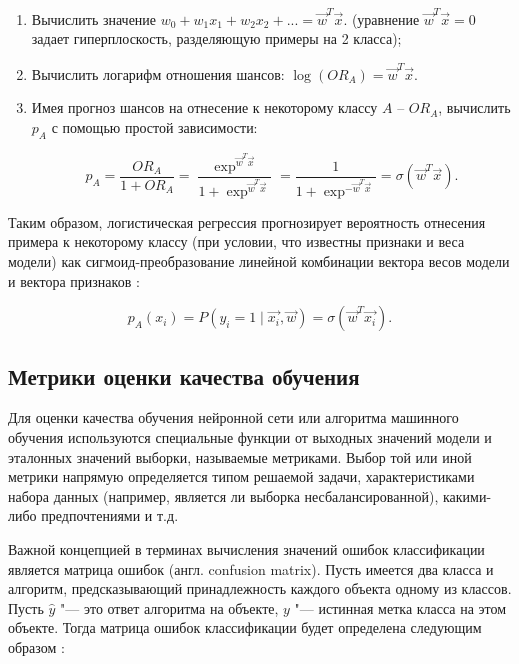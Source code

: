 \documentclass[bachelor, och, coursework]{SCWorks}
\begin{document}
            \begin{enumerate}
                \item Вычислить значение $w_{0}+w_{1}x_1 + w_{2}x_2 + ... =
                \vec{w}^T\vec{x}$. (уравнение $\vec{w}^T\vec{x} = 0$ задает
                гиперплоскость, разделяющую примеры на 2 класса);
                \item Вычислить логарифм отношения шансов: $ \log(OR_{A}) =
                \vec{w}^T\vec{x}$.
                \item Имея прогноз шансов на отнесение к некоторому классу $A$ –
                $OR_{A}$, вычислить $p_{A}$ с помощью простой зависимости:

                \begin{equation}    
                    p_{A} = \frac{OR_{A}}{1 + OR_{A}} =
                    \frac{\exp^{\vec{w}^T\vec{x}}}{1 + \exp^{\vec{w}^T\vec{x}}} =
                    \frac{1}{1 + \exp^{-\vec{w}^T\vec{x}}} = \sigma(\vec{w}^T\vec{x}).
                \end{equation}

            \end{enumerate}

            Таким образом, логистическая регрессия прогнозирует вероятность
            отнесения примера к некоторому классу (при условии, что известны
            признаки и веса модели) как сигмоид-преобразование линейной
            комбинации вектора весов модели и вектора признаков \cite{logreg2}:

            \begin{equation}
                p_A(x_i) = P\left(y_i = 1 \mid \vec{x_i}, \vec{w}\right) =
            \sigma(\vec{w}^T\vec{x_i}).
            \end{equation}

    \subsection{Метрики оценки качества обучения}

        Для оценки качества обучения нейронной сети или алгоритма машинного
        обучения используются специальные функции от выходных значений модели и
        эталонных значений выборки, называемые метриками. Выбор той или иной
        метрики напрямую определяется типом решаемой задачи, характеристиками
        набора данных (например, является ли выборка несбалансированной),
        какими-либо предпочтениями и т.д.

        Важной концепцией в терминах вычисления значений ошибок классификации
        является матрица ошибок (англ. confusion matrix). Пусть имеется два
        класса и алгоритм, предсказывающий принадлежность каждого объекта одному
        из классов. Пусть $\hat y$ "--- это ответ алгоритма на объекте, $y$ "---
        истинная метка класса на этом объекте. Тогда матрица ошибок
        классификации будет определена следующим образом \cite{mat}:
\end{document}

